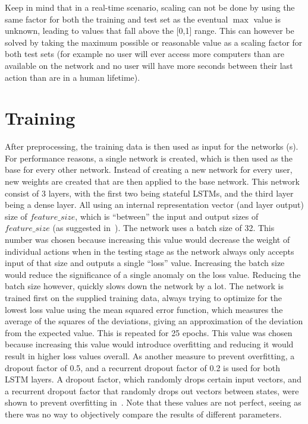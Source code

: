 Keep in mind that in a real-time scenario, scaling can not be done by using the same factor for both the training and test set as the eventual \(\max \) value is unknown, leading to values that fall above the [0,1] range. This can however be solved by taking the maximum possible or reasonable value as a scaling factor for both test sets (for example no user will ever access more computers than are available on the network and no user will have more seconds between their last action than are in a human lifetime).

\section{Training}
After preprocessing, the training data is then used as input for the networks (s). For performance reasons, a single network is created, which is then used as the base for every other network. Instead of creating a new network for every user, new weights are created that are then applied to the base network. This network consist of 3 layers, with the first two being stateful LSTMs, and the third layer being a dense layer. All using an internal representation vector (and layer output) size of \(feature\_size \), which is \enquote{between} the input and output sizes of \(feature\_size \) (as suggested in~\cite{heaton2008introduction}). The network uses a batch size of 32. This number was chosen because increasing this value would decrease the weight of individual actions when in the testing stage as the network always only accepts input of that size and outputs a single \enquote{loss} value. Increasing the batch size would reduce the significance of a single anomaly on the loss value. Reducing the batch size however, quickly slows down the network by a lot. The network is trained first on the supplied training data, always trying to optimize for the lowest loss value using the mean squared error function, which measures the average of the squares of the deviations, giving an approximation of the deviation from the expected value. This is repeated for 25 epochs. This value was chosen because increasing this value would introduce overfitting and reducing it would result in higher loss values overall. As another measure to prevent overfitting, a dropout factor of 0.5, and a recurrent dropout factor of 0.2 is used for both LSTM layers. A dropout factor, which randomly drops certain input vectors, and a recurrent dropout factor that randomly drops out vectors between states, were shown to prevent overfitting in~\cite{srivastava2014dropout}. Note that these values are not perfect, seeing as there was no way to objectively compare the results of different parameters.

